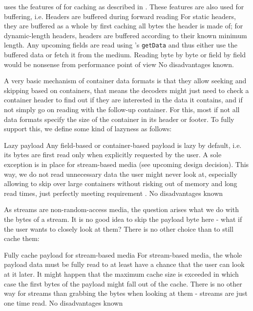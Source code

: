 \COMPdataPartManagement{} uses the features of \COMPmedia{} for caching as described in . These features are also used for buffering, i.e.
{%
Headers are buffered during forward reading
}
{%
For static headers, they are buffered as a whole by first caching all bytes the header is made of; for dynamic-length headers, headers are buffered according to their known minimum length. Any upcoming fields are read using \COMPmedia{}'s \texttt{getData} and thus either use the buffered data or fetch it from the medium.
}
{%
Reading byte by byte or field by field would be nonsense from performance point of view
}
{%
No disadvantages known.
}

A very basic mechanism of container data formats is that they allow seeking and skipping based on containers, that means the decoders might just need to check a container header to find out if they are interested in the data it contains, and if not simply go on reading with the follow-up container. For this, most if not all data formats specify the size of the container in its header or footer. To fully support this, we define some kind of lazyness as follows:

{%
Lazy payload
}
{%
Any field-based or container-based payload is lazy by default, i.e. its bytes are first read only when explicitly requested by the user. A sole exception is in place for stream-based media (see upcoming design decision). 
}
{%
This way, we do not read unnecessary data the user might never look at, especially allowing to skip over large containers without risking out of memory and long read times, just perfectly meeting requirement .
}
{%
No disadvantages known
}

As streams are non-random-access media, the question arises what we do with the bytes of a stream. It is no good idea to skip the payload byte here - what if the user wants to closely look at them? There is no other choice than to still cache them:

{%
Fully cache payload for stream-based media
}
{%
For stream-based media, the whole payload data must be fully read to at least have a chance that the user can look at it later. It might happen that the maximum cache size is exceeded in which case the first bytes of the payload might fall out of the cache.
}
{%
There is no other way for streams than grabbing the bytes when looking at them - streams are just one time read.
}
{%
No disadvantages known
}

